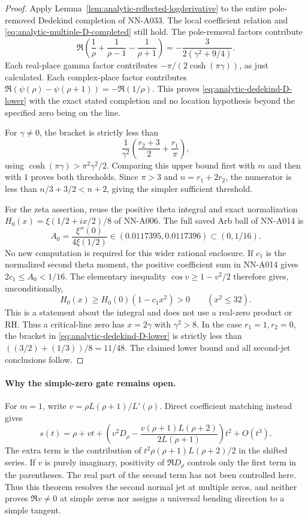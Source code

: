 \begin{proof}
Apply Lemma~\ref{lem:analytic-reflected-logderivative} to the
entire pole-removed Dedekind completion of NN-A033. The
local coefficient relation and
\eqref{eq:analytic-multiple-D-completed} still hold. The
pole-removal factors contribute
\[
 \Re\left(\frac1\rho+\frac1{\rho-1}
                                  -\frac1{\rho+1}\right)
                  =-\frac{3}{2(\gamma^2+9/4)}.
\]
Each real-place gamma factor contributes
$-\pi/(2\cosh(\pi\gamma))$, as just calculated. Each
complex-place factor contributes
$\Re(\psi(\rho)-\psi(\rho+1))=-\Re(1/\rho)$.
This proves \eqref{eq:analytic-dedekind-D-lower} with the
exact stated completion and no location hypothesis beyond
the specified zero being on the line.

For $\gamma\ne0$, the bracket is strictly less than
\[
 \frac1{\gamma^2}
        \left(\frac{r_2+3}{2}+\frac{r_1}{\pi}\right),
\]
using $\cosh(\pi\gamma)>\pi^2\gamma^2/2$. Comparing this
upper bound first with $m$ and then with $1$ proves both
thresholds. Since $\pi>3$ and $n=r_1+2r_2$,
the numerator is less than $n/3+3/2<n+2$, giving the
simpler sufficient threshold.

For the zeta assertion, reuse the positive theta integral
and exact normalization $H_0(x)=\xi(1/2+ix/2)/8$ of
NN-A006. The full saved Arb ball of NN-A014 is
\[
 A_0=\frac{\xi''(0)}{4\xi(1/2)}
       \in (0.0117395,0.0117396)\subset(0,1/16).
\]
No new computation is required for this wider rational
enclosure. If $c_1$ is the normalized second theta moment,
the positive coefficient sum in NN-A014 gives
$2c_1\le A_0<1/16$. The elementary inequality
$\cos v\ge1-v^2/2$ therefore gives, unconditionally,
\[
 H_0(x)\ge H_0(0)(1-c_1x^2)>0\qquad(x^2\le32).
\]
This is a statement about the integral and does not use a
real-zero product or RH. Thus a critical-line zero has
$x=2\gamma$ with $\gamma^2>8$. In the case $r_1=1,r_2=0$,
the bracket in \eqref{eq:analytic-dedekind-D-lower} is
strictly less than
$((3/2)+(1/3))/8=11/48$. The claimed lower bound and all
second-jet conclusions follow.
\end{proof}

\paragraph{Why the simple-zero gate remains open.}
For $m=1$, write $v=\rho L(\rho+1)/L'(\rho)$. Direct
coefficient matching instead gives
\begin{equation}\label{eq:analytic-simple-extra-term}
 s(t)=\rho+vt+
 \left(v^2D_\rho-
       \frac{v(\rho+1)L(\rho+2)}{2L(\rho+1)}\right)t^2
       +O(t^3).
\end{equation}
The extra term is the contribution of
$t^2\rho(\rho+1)L(\rho+2)/2$ in the shifted series.
If $v$ is purely imaginary, positivity of $\Re D_\rho$
controls only the first term in the parentheses. The real
part of the second term has not been controlled here.
Thus this theorem resolves the second normal jet at multiple
zeros, and neither proves $\Re v\ne0$ at simple zeros nor
assigns a universal bending direction to a simple tangent.

